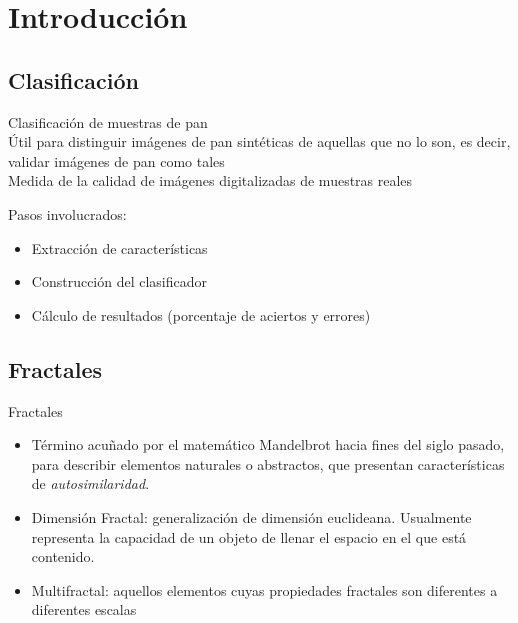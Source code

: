 \documentclass{beamer}
\begin{document}

\section{Introducci\'on}

\subsection{Clasificaci\'on}

\begin{frame}
\begin{center}
{\huge Clasificaci\'on de muestras de pan }\\
\vspace{10px}
{\large \'Util para distinguir im\'agenes de pan sint\'eticas de aquellas que no lo son, es decir, validar im\'agenes de pan como tales}\\
\vspace{10px}
{\large Medida de la calidad de im\'agenes digitalizadas de muestras reales}\\
\end{center}
\end{frame}

\begin{frame}
\begin{center}
{\huge Pasos involucrados: }\\
\begin{itemize}
\item Extracci\'on de caracter\'isticas
\item Construcci\'on del clasificador
\item C\'alculo de resultados (porcentaje de aciertos y errores)
\end{itemize}
\end{center}
\end{frame}

\subsection{Fractales}
\begin{frame}
{\huge Fractales }
\begin{itemize}
\item T\'ermino acu\~nado por el matem\'atico Mandelbrot hacia fines del siglo pasado, para describir elementos naturales o abstractos, que presentan caracter\'isticas de {\em autosimilaridad}.
\item Dimensi\'on Fractal: generalizaci\'on de dimensi\'on euclideana. Usualmente representa la capacidad de un objeto de llenar el espacio en el que est\'a contenido.
\item Multifractal: aquellos elementos cuyas propiedades fractales son diferentes a diferentes escalas
\end{itemize}
\end{frame}
\end{document}
